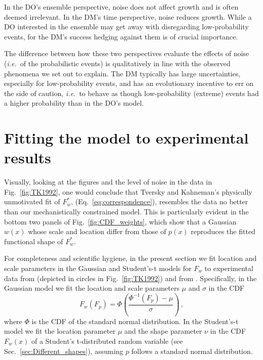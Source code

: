 \documentclass[a4paper, 12pt]{article}
\newcommand{\eref}[1]{(Eq.~\ref{eq:#1})}
\newcommand{\fref}[1]{Fig.~\ref{fig:#1}}
\newcommand{\seclabel}[1]{\label{sec:#1}}
\newcommand{\secref}[1]{Sec.~\ref{sec:#1}}
\newcommand{\ie}{{\it i.e.}\ }
\newcommand{\be}{\begin{equation}}
\newcommand{\ee}{\end{equation}}
\begin{document}
In the DO's ensemble perspective, noise does not affect growth and is often deemed irrelevant. In the DM's time perspective, noise reduces growth. While a DO interested in the ensemble may get away with disregarding low-probability events, for the DM's success hedging against them is of crucial importance.

The difference between how these two perspectives evaluate the effects of noise (\ie of the probabilistic events) is qualitatively in line with the observed phenomena we set out to explain. The DM typically has large uncertainties, especially for low-probability events, and has an evolutionary incentive to err on the side of caution, \ie to behave as though low-probability (extreme) events had a higher probability than in the DO's model.


\section{Fitting the model to experimental results \seclabel{Fitting_the}}

Visually, looking at the figures and the level of noise in the data in \fref{TK1992}, one would conclude that Tversky and Kahneman's physically unmotivated fit of $F^*_w$, \eref{correspondence}, resembles the data no better than our mechanistically constrained model. This is particularly evident in the bottom two panels of \fref{CDF_weights}, which show that a Gaussian $w(x)$ whose scale and location differ from those of $p(x)$ reproduces the fitted functional shape of $F^*_w$.

For completeness and scientific hygiene, in the present section we fit location and scale parameters in the Gaussian and Student's-t models for $F_w$ to experimental data from \cite{TverskyKahneman1992} (depicted in circles in \fref{TK1992}) and from \cite{TverskyFox1995}. Specifically, in the Gaussian model we fit the location and scale parameters $\mu$ and $\sigma$ in the CDF
%
\be
F_w\left(F_p\right) = \Phi\left(\frac{\Phi^{-1}\left(F_p\right) - \mu}{\sigma}\right)\,,
\ee
%
where $\Phi$ is the CDF of the standard normal distribution. In the Student's-t model we fit the location parameter $\mu$ and the shape parameter $\nu$ in the CDF $F_w\left(x\right)$ of a Student's t-distributed random variable (see \secref{Different_shapes}), assuming $p$ follows a standard normal distribution.

\end{document}
